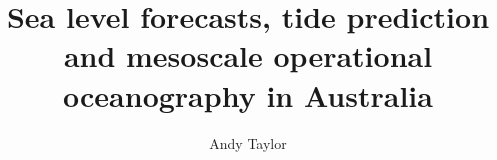 \documentclass[11pt,a4paper,titlepage,twoside,openrigh]{book}
\title{Sea level forecasts, tide prediction and mesoscale operational oceanography in Australia}
\author{Andy Taylor}
\begin{document}
	\begin{frontmatter}
		\frontmatterheadings    %
		\maketitle              %
		\makedeclaration        %
		
		
		
		{
			\singlespacing
			\tableofcontents
			\listoffigures
		   \clearpage
		}
   \end{frontmatter}
	\begin{mainmatter}
		\mainmatterheadings
		
		
		
		
		
		
	\end{mainmatter}
	
	
    \begin{appendix}
		
		
	\end{appendix}
\end{document}

